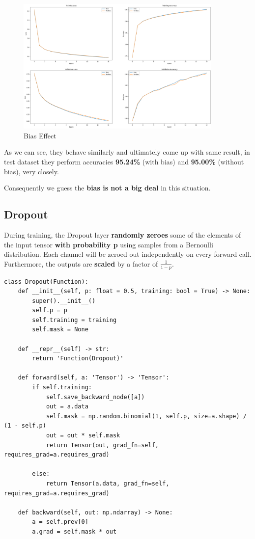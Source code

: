 \documentclass[a4paper, 11pt]{article} %
\begin{document}
\begin{figure}[H]
    \centering
    \includegraphics[width=0.9\textwidth]{./img/bias.png}
    \caption{Bias Effect}
\end{figure}

As we can see, they behave similarly and ultimately come up with same result, in test dataset
they perform accuracies \textbf{95.24\%} (with bias) and \textbf{95.00\%} (without bias),
very closely.

Consequently we guess the \textbf{bias is not a big deal} in this situation.

\subsection{\textbf{Dropout}}

During training, the Dropout layer \textbf{randomly zeroes} some of the elements of the input
tensor \textbf{with probability p} using samples from a Bernoulli distribution. Each channel
will be zeroed out independently on every forward call. Furthermore, the outputs are \textbf{scaled}
by a factor of $\frac{1}{1-p}$.

\begin{lstlisting}
class Dropout(Function):
    def __init__(self, p: float = 0.5, training: bool = True) -> None:
        super().__init__()
        self.p = p
        self.training = training
        self.mask = None

    def __repr__(self) -> str:
        return 'Function(Dropout)'

    def forward(self, a: 'Tensor') -> 'Tensor':
        if self.training:
            self.save_backward_node([a])
            out = a.data
            self.mask = np.random.binomial(1, self.p, size=a.shape) / (1 - self.p)
            out = out * self.mask
            return Tensor(out, grad_fn=self, requires_grad=a.requires_grad)

        else:
            return Tensor(a.data, grad_fn=self, requires_grad=a.requires_grad)

    def backward(self, out: np.ndarray) -> None:
        a = self.prev[0]
        a.grad = self.mask * out
\end{lstlisting}
\end{document}
